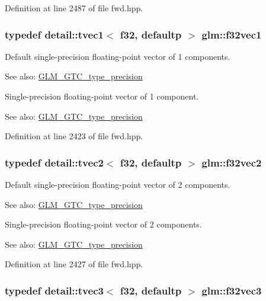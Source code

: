 Definition at line 2487 of file fwd.hpp.\hypertarget{group__gtc__type__precision_g7335bddf7a09ba275d5d04f7681f03e6}{
\subsubsection[f32vec1]{\setlength{\rightskip}{0pt plus 5cm}typedef detail::tvec1$<$ f32, defaultp $>$ {\bf glm::f32vec1}}}
\label{group__gtc__type__precision_g7335bddf7a09ba275d5d04f7681f03e6}


Default single-precision floating-point vector of 1 components. \begin{Desc}
\item[See also:]\hyperlink{group__gtc__type__precision}{GLM\_\-GTC\_\-type\_\-precision}\end{Desc}
Single-precision floating-point vector of 1 component. \begin{Desc}
\item[See also:]\hyperlink{group__gtc__type__precision}{GLM\_\-GTC\_\-type\_\-precision} \end{Desc}


Definition at line 2423 of file fwd.hpp.\hypertarget{group__gtc__type__precision_g0eba48c6b8abbee31dbf5655dd171ead}{
\subsubsection[f32vec2]{\setlength{\rightskip}{0pt plus 5cm}typedef detail::tvec2$<$ f32, defaultp $>$ {\bf glm::f32vec2}}}
\label{group__gtc__type__precision_g0eba48c6b8abbee31dbf5655dd171ead}


Default single-precision floating-point vector of 2 components. \begin{Desc}
\item[See also:]\hyperlink{group__gtc__type__precision}{GLM\_\-GTC\_\-type\_\-precision}\end{Desc}
Single-precision floating-point vector of 2 components. \begin{Desc}
\item[See also:]\hyperlink{group__gtc__type__precision}{GLM\_\-GTC\_\-type\_\-precision} \end{Desc}


Definition at line 2427 of file fwd.hpp.\hypertarget{group__gtc__type__precision_g9b74939fb3bdd450be65f798037dd79d}{
\subsubsection[f32vec3]{\setlength{\rightskip}{0pt plus 5cm}typedef detail::tvec3$<$ f32, defaultp $>$ {\bf glm::f32vec3}}}
\label{group__gtc__type__precision_g9b74939fb3bdd450be65f798037dd79d}


